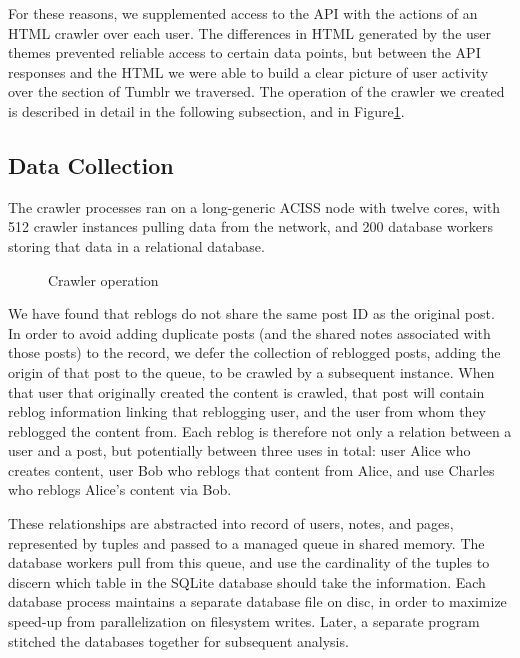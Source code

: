 For these reasons, we supplemented access to the API with the actions 
of an HTML crawler over each user.  The differences in HTML generated 
by the user themes prevented reliable access to certain data points, 
but between the API responses and the HTML we were able to build a 
clear picture of user activity over the section of Tumblr we 
traversed.  The operation of the crawler we created is described 
in detail in the following subsection, and in Figure\ref{crawler}.

\subsection{Data Collection}

The crawler processes ran on a long-generic ACISS node with twelve 
cores, with 512 crawler instances pulling data from the network, 
and 200 database workers storing that data in a relational database.

\begin{figure}
  
  \caption{Crawler operation}\label{crawler}
\end{figure}

We have found that reblogs do not share the same post ID as the original 
post.  In order to avoid adding duplicate posts (and the shared notes 
associated with those posts) to the record, we defer the collection of 
reblogged posts, adding the origin of that post to the queue, to be 
crawled by a subsequent instance.  When that user that originally 
created the content is crawled, that post will contain reblog 
information linking that reblogging user, and the user from whom they 
reblogged the content from.  Each reblog is therefore not only a 
relation between a user and a post, but potentially between three 
uses in total: user Alice who creates content, user Bob who reblogs 
that content from Alice, and use Charles who reblogs Alice's content 
via Bob.


These relationships are abstracted into record of users, notes, and pages, 
represented by tuples and passed to a managed queue in 
shared memory.  The database workers pull from this queue, and use 
the cardinality of the tuples to discern which table in the SQLite 
database should take the information.  Each database process 
maintains a separate database file on disc, in order to maximize 
speed-up from parallelization on filesystem writes.  Later, a 
separate program stitched the databases together for subsequent 
analysis.

